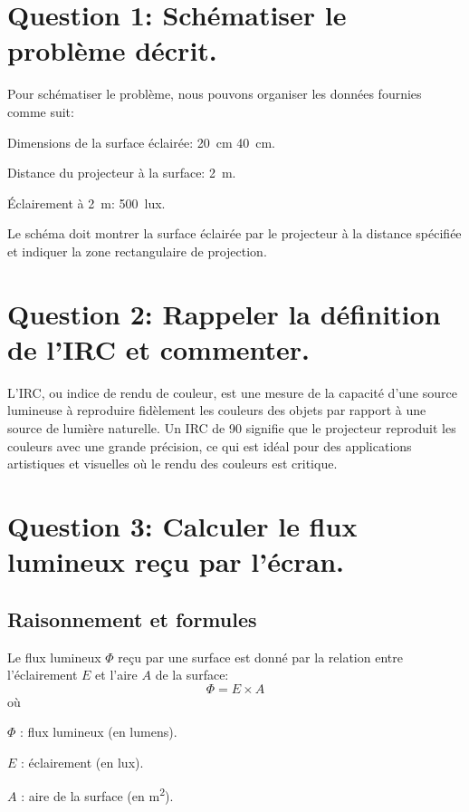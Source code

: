 \documentclass[answers]{exam}
\begin{document}
    \begin{solution}
\begin{questions}

\section*{Question 1: Schématiser le problème décrit.}
Pour schématiser le problème, nous pouvons organiser les données fournies comme suit:
\begin{compactitem}
    \item Dimensions de la surface éclairée: \SI{20}{\centi\meter} \times \SI{40}{\centi\meter}.
    \item Distance du projecteur à la surface: \SI{2}{\meter}.
    \item Éclairement à \SI{2}{\meter}: \SI{500}{lux}.
\end{compactitem}
Le schéma doit montrer la surface éclairée par le projecteur à la distance spécifiée et indiquer la zone rectangulaire de projection.

\section*{Question 2: Rappeler la définition de l'IRC et commenter.}
L'IRC, ou indice de rendu de couleur, est une mesure de la capacité d'une source lumineuse à reproduire fidèlement les couleurs des objets par rapport à une source de lumière naturelle. Un IRC de 90 signifie que le projecteur reproduit les couleurs avec une grande précision, ce qui est idéal pour des applications artistiques et visuelles où le rendu des couleurs est critique.

\section*{Question 3: Calculer le flux lumineux reçu par l'écran.}
\subsection*{Raisonnement et formules}
Le flux lumineux \(\Phi\) reçu par une surface est donné par la relation entre l'éclairement \(E\) et l'aire \(A\) de la surface:
\[
\Phi = E \times A
\]
où
\begin{addmargin}[4em]{1em}
\begin{compactitem}
    \item [\(\Phi\)]: flux lumineux (en lumens).
    \item [\(E\)]: éclairement (en lux).
    \item [\(A\)]: aire de la surface (en \si{\meter\squared}).
\end{compactitem}
\end{addmargin}


\end{questions}
\end{solution}
\end{document}
